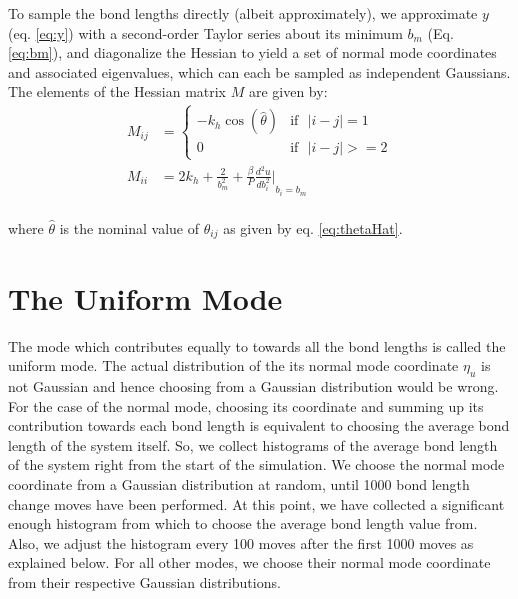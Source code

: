 \label{Appendix B}
    To sample the bond lengths directly (albeit approximately), we approximate $y$ (eq. \eqref{eq:y}) with a second-order Taylor series about its minimum $b_m$ (Eq. \eqref{eq:bm}), and diagonalize the Hessian to yield a set of normal mode coordinates and associated eigenvalues, which can each be sampled as independent Gaussians. The elements of the Hessian matrix $M$ are given by:
    \begin{equation}
        \begin{aligned}
            M_{ij} &= \begin{cases}
            - k_{h}  \cos (\hat \theta) & \text{if} \: \: \: | i - j | = 1\\
            0 & \text{if} \: \: \: | i - j | >= 2
            \end{cases}\\
            M_{ii} &= 2  k_{h} + \frac{2}{b_{m}^2} + \frac{\beta}{P}  {\frac{d^2 u}{d b_i^2} \Bigg|}_{b_i = b_{m}}\\
        \end{aligned}
    \end{equation}

    where $\hat \theta$ is the nominal value of $\theta_{ij}$ as given by eq. \eqref{eq:thetaHat}.

    \section{The Uniform Mode}
        The mode which contributes equally to towards all the bond lengths is called the uniform mode. The actual distribution of the its normal mode coordinate $\eta_u$ is not Gaussian and hence choosing from a Gaussian distribution would be wrong. For the case of the normal mode, choosing its coordinate and summing up its contribution towards each bond length is equivalent to choosing the average bond length of the system itself. So, we collect histograms of the average bond length of the system right from the start of the simulation. We choose the normal mode coordinate from a Gaussian distribution at random, until 1000 bond length change moves have been performed. At this point, we have collected a significant enough histogram from which to choose the average bond length value from. Also, we adjust the histogram every 100 moves after the first 1000 moves as explained below. For all other modes, we choose their normal mode coordinate from their respective Gaussian distributions.

